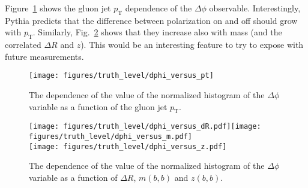 
Figure~\ref{fig:truth:dphipt} shows the gluon jet $p_\text{T}$ dependence of the $\Delta\phi$ observable.  Interestingly, Pythia predicts that the difference between polarization on and off should grow with $p_\text{T}$.  Similarly, Fig.~\ref{fig:truth:dphi2} shows that they increase also with mass (and the correlated $\Delta R$ and $z$).  This would be an interesting feature to try to expose with future measurements.

\begin{figure}[htbp]
  \centering
 \texttt{[image: figures/truth\_level/dphi\_versus\_pt]}

\caption{The dependence of the value of the normalized histogram of the $\Delta\phi$ variable as a function of the gluon jet $p_\text{T}$. }
  \label{fig:truth:dphipt}
\end{figure}


\begin{figure}[htbp]
  \centering
 \texttt{[image: figures/truth\_level/dphi\_versus\_dR.pdf]}\texttt{[image: figures/truth\_level/dphi\_versus\_m.pdf]}\\\texttt{[image: figures/truth\_level/dphi\_versus\_z.pdf]}

\caption{The dependence of the value of the normalized histogram of the $\Delta\phi$ variable as a function of $\Delta R$, $m(b,b)$ and $z(b,b)$. }
  \label{fig:truth:dphi2}
\end{figure}



